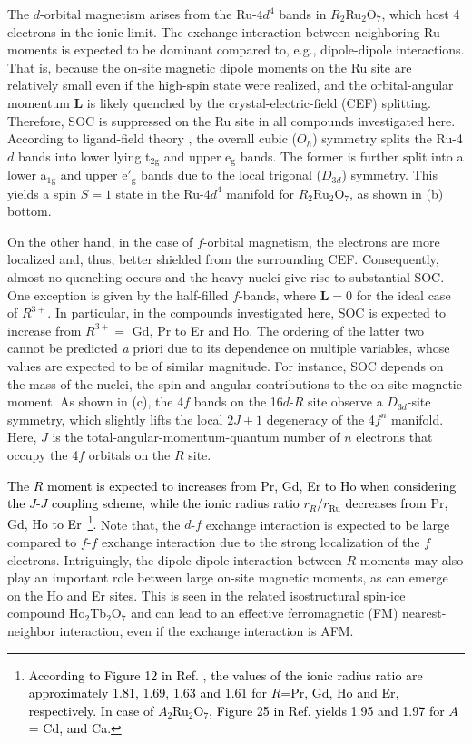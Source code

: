 \documentclass[10pt]{iopart}
\newcommand{\red}[1]{\textcolor{black}{#1}}
\begin{document}
The $d$-orbital magnetism arises from the Ru-$4d^4$ bands in $R_2$Ru$_2$O$_7$, which host 4 electrons in the ionic limit. The exchange interaction between neighboring Ru moments is expected to be dominant compared to, e.g., dipole-dipole interactions. That is, because the on-site magnetic dipole moments on the Ru site are relatively small even if the high-spin state were realized, and the orbital-angular momentum $\mathbf{L}$ is likely quenched by the crystal-electric-field (CEF) splitting. Therefore, SOC is suppressed on the Ru site in all compounds investigated here. According to ligand-field theory \cite{sugano2012multiplets}, the overall cubic ($O_h$) symmetry splits the Ru-4$d$ bands into lower lying t$_{2\mathrm{g}}$ and upper e$_{\mathrm{g}}$ bands. The former is further split into a lower a$_{1\mathrm{g}}$ and upper e$'_\mathrm{g}$ bands due to the local trigonal ($D_{3d}$) symmetry. This yields a spin $S=1$ state in the Ru-$4d^4$ manifold for $R_2$Ru$_2$O$_7$, as shown in  (b) bottom.

On the other hand, in the case of $f$-orbital magnetism, the electrons are more localized and, thus, better shielded from the surrounding CEF. Consequently, almost no quenching occurs and the heavy nuclei give rise to substantial SOC. One exception is given by the half-filled $f$-bands, where $\mathbf{L}=0$ for the ideal case of $R^{3+}$. In particular, in the compounds investigated here, SOC is expected to increase from $R^{3+}=$ Gd, Pr to Er and Ho. The ordering of the latter two cannot be predicted {\textit a priori} due to its dependence on multiple variables, whose values are expected to be of similar magnitude. For instance, SOC depends on the mass of the nuclei, the spin and angular contributions to the on-site magnetic moment. As shown in  (c), the 4$f$ bands on the 16$d$-$R$ site observe a $D_{3d}$-site symmetry, which slightly lifts the local $2J+1$ degeneracy of the 4$f^n$ manifold. Here, $J$ is the total-angular-momentum-quantum number of $n$ electrons that occupy the 4$f$ orbitals on the $R$ site.

\red{The $R$ moment is expected to increases from Pr, Gd, Er to Ho when considering the $J$-$J$ coupling scheme, while the ionic radius ratio $r_R/r_{\mathrm{Ru}}$ decreases from Pr, Gd, Ho to Er~\footnote{\red{According to Figure 12 in Ref. \cite{subramanian1983oxide}, the values of the ionic radius ratio are approximately 1.81, 1.69, 1.63 and 1.61 for $R$=Pr, Gd, Ho and Er, respectively. In case of $A_2$Ru$_2$O$_7$, Figure 25 in Ref. \cite{subramanian1983oxide} yields 1.95 and 1.97 for $A$= Cd, and Ca.}}.}
Note that, the $d$-$f$ exchange interaction is expected to be large compared to $f$-$f$ exchange interaction due to the strong localization of the $f$ electrons. Intriguingly, the dipole-dipole interaction between $R$ moments may also play an important role between large on-site magnetic moments, as can emerge on the Ho and Er sites. This is seen in the related isostructural spin-ice compound Ho$_2$Tb$_2$O$_7$ \cite{harris1997geometrical,bramwell2001spin,bramwell2001science} and can lead to an effective ferromagnetic (FM) nearest-neighbor interaction, even if the exchange interaction is AFM.
\end{document}
